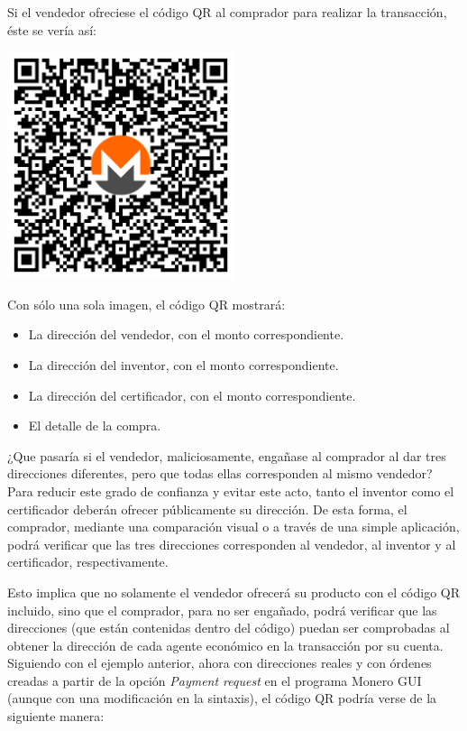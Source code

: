 \documentclass[12pt,a4paper]{article}
\begin{document}
Si el vendedor ofreciese el código QR al comprador para realizar la transacción, éste se vería así:

\begin{center}
\includegraphics[width=0.5\textwidth]{media/qr-code2.pdf}
\end{center}

Con sólo una sola imagen, el código QR mostrará:

\begin{itemize}
\item La dirección del vendedor, con el monto correspondiente.
\item La dirección del inventor, con el monto correspondiente.
\item La dirección del certificador, con el monto correspondiente.
\item El detalle de la compra.
\end{itemize}

¿Que pasaría si el vendedor, maliciosamente, engañase al comprador al dar tres direcciones diferentes, pero que todas ellas corresponden al mismo vendedor? Para reducir este grado de confianza y evitar este acto, tanto el inventor como el certificador deberán ofrecer públicamente su dirección. De esta forma, el comprador, mediante una comparación visual o a través de una simple aplicación, podrá verificar que las tres direcciones corresponden al vendedor, al inventor y al certificador, respectivamente.

Esto implica que no solamente el vendedor ofrecerá su producto con el código QR incluido, sino que el comprador, para no ser engañado, podrá verificar que las direcciones (que están contenidas dentro del código) puedan ser comprobadas al obtener la dirección de cada agente económico en la transacción por su cuenta. Siguiendo con el ejemplo anterior, ahora con direcciones reales y con órdenes creadas a partir de la opción \textit{Payment request} en el programa Monero GUI (aunque con una modificación en la sintaxis), el código QR podría verse de la siguiente manera:
\end{document}
